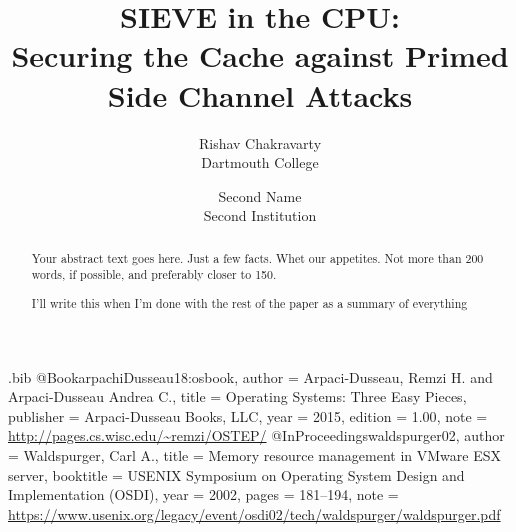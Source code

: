 \usepackage{filecontents}

\begin{filecontents}{\jobname.bib}
@Book{arpachiDusseau18:osbook,
  author =       {Arpaci-Dusseau, Remzi H. and Arpaci-Dusseau Andrea C.},
  title =        {Operating Systems: Three Easy Pieces},
  publisher =    {Arpaci-Dusseau Books, LLC},
  year =         2015,
  edition =      {1.00},
  note =         {\url{http://pages.cs.wisc.edu/~remzi/OSTEP/}}
}
@InProceedings{waldspurger02,
  author =       {Waldspurger, Carl A.},
  title =        {Memory resource management in {VMware ESX} server},
  booktitle =    {USENIX Symposium on Operating System Design and
                  Implementation (OSDI)},
  year =         2002,
  pages =        {181--194},
  note =         {\url{https://www.usenix.org/legacy/event/osdi02/tech/waldspurger/waldspurger.pdf}}}
\end{filecontents}



\date{}

\title{\Large \bf SIEVE in the CPU:\\
  Securing the Cache against Primed Side Channel Attacks}

\author{
{\rm Rishav Chakravarty}\\
Dartmouth College
\and
{\rm Second Name}\\
Second Institution
} %

\maketitle

\begin{abstract}
Your abstract text goes here. Just a few facts. Whet our appetites.
Not more than 200 words, if possible, and preferably closer to 150.

I'll write this when I'm done with the rest of the paper as a summary of everything
\end{abstract}


